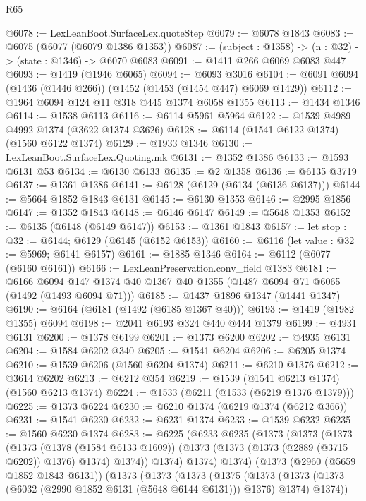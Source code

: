 \begin{lexlean}{R65}
\begin{coremodule}
@6078 := LexLeanBoot.SurfaceLex.quoteStep
@6079 := @6078 @1843
@6083 := @6075 (@6077 (@6079 @1386 @1353))
@6087 := (subject : @1358) -> (n : @32) -> (state : @1346) -> @6070 @6083
@6091 := @1411 @266 @6069 @6083 @447
@6093 := @1419 (@1946 @6065)
@6094 := @6093 @3016
@6104 := @6091 @6094 (@1436 (@1446 @266)) (@1452 (@1453 (@1454 @447) @6069 @1429))
@6112 := @1964 @6094 @124 @11 @318 @445 @1374 @6058 @1355
@6113 := @1434 @1346
@6114 := @1538 @6113
@6116 := @6114 @5961 @5964
@6122 := @1539 @4989 @4992 @1374 (@3622 @1374 @3626)
@6128 := @6114 (@1541 @6122 @1374) (@1560 @6122 @1374)
@6129 := @1933 @1346
@6130 := LexLeanBoot.SurfaceLex.Quoting.mk
@6131 := @1352 @1386
@6133 := @1593 @6131 @53
@6134 := @6130 @6133
@6135 := @2 @1358
@6136 := @6135 @3719
@6137 := @1361 @1386
@6141 := @6128 (@6129 (@6134 (@6136 @6137)))
@6144 := @5664 @1852 @1843 @6131
@6145 := @6130 @1353
@6146 := @2995 @1856
@6147 := @1352 @1843
@6148 := @6146 @6147
@6149 := @5648 @1353
@6152 := @6135 (@6148 (@6149 @6147))
@6153 := @1361 @1843
@6157 := let stop : @32 := @6144; @6129 (@6145 (@6152 @6153))
@6160 := @6116 (let value : @32 := @5969; @6141 @6157)
@6161 := @1885 @1346
@6164 := @6112 (@6077 (@6160 @6161))
@6166 := LexLeanPreservation.conv_field @1383
@6181 := @6166
    @6094
    @147
    @1374
    @40
    @1367
    @40
    @1355
    (@1487 @6094 @71 @6065 (@1492 (@1493 @6094 @71)))
@6185 := @1437 @1896 @1347 (@1441 @1347)
@6190 := @6164 (@6181 (@1492 (@6185 @1367 @40)))
@6193 := @1419 (@1982 @1355) @6094
@6198 := @2041 @6193 @324 @440 @444 @1379
@6199 := @4931 @6131
@6200 := @1378 @6199
@6201 := @1373 @6200
@6202 := @4935 @6131
@6204 := @1584 @6202 @340
@6205 := @1541 @6204
@6206 := @6205 @1374
@6210 := @1539 @6206 (@1560 @6204 @1374)
@6211 := @6210 @1376
@6212 := @3614 @6202
@6213 := @6212 @354
@6219 := @1539 (@1541 @6213 @1374) (@1560 @6213 @1374)
@6224 := @1533 (@6211 (@1533 (@6219 @1376 @1379)))
@6225 := @1373 @6224
@6230 := @6210 @1374 (@6219 @1374 (@6212 @366))
@6231 := @1541 @6230
@6232 := @6231 @1374
@6233 := @1539 @6232
@6235 := @1560 @6230 @1374
@6283 := @6225
    (@6233
      @6235
      (@1373
        (@1373
          (@1373
            (@1373
              (@1378 (@1584 @6133 @1609))
              (@1373 (@1373 (@1373 (@2889 (@3715 @6202)) @1376) @1374) @1374))
            @1374)
          @1374)
        @1374)
      (@1373
        (@2960 (@5659 @1852 @1843 @6131))
        (@1373
          (@1373
            (@1373
              (@1375
                (@1373
                  (@1373 (@1373 (@6032 (@2990 @1852 @6131 (@5648 @6144 @6131))) @1376) @1374)
                  @1374))

\end{coremodule}
\end{lexlean}
